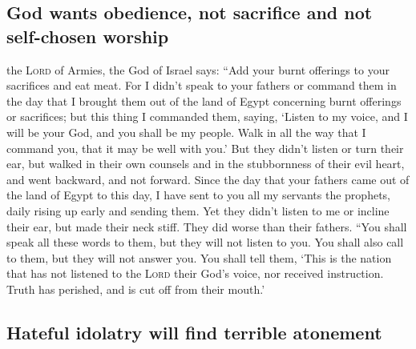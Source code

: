\hypertarget{god-wants-obedience-not-sacrifice-and-not-self-chosen-worship}{%
\subsection{God wants obedience, not sacrifice and not self-chosen
worship}\label{god-wants-obedience-not-sacrifice-and-not-self-chosen-worship}}

 the \textsc{Lord} of Armies, the God of Israel says:
``Add your burnt offerings to your sacrifices and eat meat.
 For I didn't speak to your fathers or command them in
the day that I brought them out of the land of Egypt concerning burnt
offerings or sacrifices;  but this thing I commanded
them, saying, `Listen to my voice, and I will be your God, and you shall
be my people. Walk in all the way that I command you, that it may be
well with you.'  But they didn't listen or turn their
ear, but walked in their own counsels and in the stubbornness of their
evil heart, and went backward, and not forward.  Since
the day that your fathers came out of the land of Egypt to this day, I
have sent to you all my servants the prophets, daily rising up early and
sending them.  Yet they didn't listen to me or incline
their ear, but made their neck stiff. They did worse than their fathers.
 ``You shall speak all these words to them, but they will
not listen to you. You shall also call to them, but they will not answer
you.  You shall tell them, `This is the nation that has
not listened to the \textsc{Lord} their God's voice, nor received
instruction. Truth has perished, and is cut off from their mouth.'

\hypertarget{hateful-idolatry-will-find-terrible-atonement}{%
\subsection{Hateful idolatry will find terrible
atonement}\label{hateful-idolatry-will-find-terrible-atonement}}

